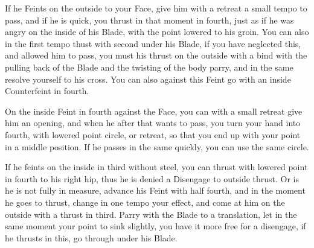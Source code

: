 If he Feints on the outside to your Face, give him with a retreat a
small tempo to pass, and if he is quick, you thrust in that moment in
fourth, just as if he was angry on the inside of his Blade, with the
point lowered to his groin. You can also in the first tempo thust with
second under his Blade, if you have neglected this, and allowed him to
pass, you must his thrust on the outside with a bind with the pulling
back of the Blade and the twisting of the body parry, and in the same
resolve yourself to his cross. You can also against this Feint go with an
inside Counterfeint in fourth.


On the inside Feint in fourth against the Face, you can with a small
retreat give him an opening, and when he after that wants to pass, you
turn your hand into fourth, with lowered point circle, or retreat, so
that you end up with your point in a middle position. If he passes in
the same quickly, you can use the same circle.


If he feints on the inside in third without steel, you can thrust with
lowered point in fourth to his right hip, thus he is denied a
Disengage to outside thrust. Or is he is not fully in measure,
advance his Feint with half fourth, and in the moment he goes to
thrust, change in one tempo your effect, and come at him on the
outside with a thrust in third. Parry with the Blade to a translation,
let in the same moment your point to sink slightly, you have it more
free for a disengage, if he thrusts in this, go through under his Blade.

